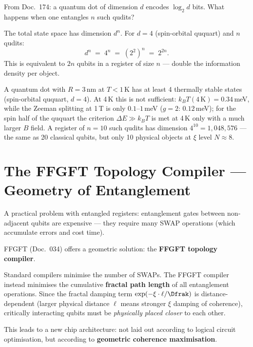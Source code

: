 From Doc.~174: a quantum dot of dimension $d$
encodes $\log_2 d$ bits.
What happens when one entangles $n$ such qudits?

The total state space has dimension $d^n$.
For $d = 4$ (spin-orbital ququart) and $n$ qudits:
\begin{equation}
  d^n \;=\; 4^n \;=\; (2^2)^n \;=\; 2^{2n}.
\end{equation}
This is equivalent to $2n$ qubits in a register
of size $n$ --- double the information density per object.

\begin{keyresult}
A quantum dot with $R = 3$\,nm at $T < 1$\,K
has at least 4 thermally stable states
(spin-orbital ququart, $d = 4$).
At 4\,K this is not sufficient: $k_BT(4\,\text{K}) = 0.34$\,meV, while the Zeeman splitting at 1\,T is only $0.1$--$1$\,meV ($g = 2$: $0.12$\,meV); for the spin half of the ququart the criterion $\Delta E \gg k_BT$ is met at 4\,K only with a much larger $B$ field.
A register of $n = 10$ such qudits
has dimension $4^{10} = 1,048,576$ ---
the same as 20 classical qubits, but
only 10 physical objects at $\xi$ level $N \approx 8$.
\end{keyresult}

\section{The FFGFT Topology Compiler --- Geometry of Entanglement}
\label{sec:compiler}

A practical problem with entangled registers:
entanglement gates between non-adjacent qubits
are expensive --- they require many SWAP operations
(which accumulate errors and cost time).

FFGFT (Doc.~034) offers a geometric
solution: the \textbf{FFGFT topology compiler}.

Standard compilers minimise the number of SWAPs.
The FFGFT compiler instead minimises the cumulative
\textbf{fractal path length} of all entanglement operations.
Since the fractal damping term $\exp(-\xi \cdot \ell / \Dfrak)$
is distance-dependent (larger physical distance $\ell$
means stronger $\xi$ damping of coherence),
critically interacting qubits must be
\emph{physically placed closer} to each other.

This leads to a new chip architecture:
not laid out according to logical circuit optimisation,
but according to \textbf{geometric coherence maximisation}.

